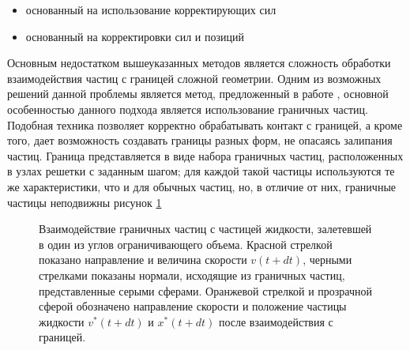 \begin{itemize}
\item основанный на использование корректирующих сил \cite {Müller2004}
\item основанный на корректировки сил и позиций \cite {Becker2009}
\end{itemize}

Основным недостатком вышеуказанных методов является сложность обработки взаимодействия частиц с границей сложной геометрии. Одним из возможных решений данной проблемы является метод, предложенный в работе  \cite {Ihmsen2010}, основной особенностью данного подхода является использование граничных частиц. Подобная техника позволяет корректно обрабатывать контакт с границей, а кроме того, дает возможность создавать границы разных форм, не опасаясь залипания частиц. Граница представляется в виде набора граничных частиц, расположенных в узлах решетки с заданным шагом; для каждой такой частицы используются те же характеристики, что и для обычных частиц, но, в отличие от них, граничные частицы неподвижны рисунок \ref{fig:boundary}
\begin{figure}[ht]
  \caption{Взаимодействие граничных частиц с частицей жидкости, залетевшей в один из углов ограничивающего объема. Красной стрелкой показано направление и величина скорости \(v(t+dt)\), черными стрелками показаны нормали, исходящие из граничных частиц, представленные серыми сферами. Оранжевой стрелкой и прозрачной сферой обозначено направление скорости и положение частицы жидкости \(v^{*}(t+dt)\) и \(x^{*}(t+dt)\) после взаимодействия с границей.}
\label{fig:boundary}
\end{figure}

